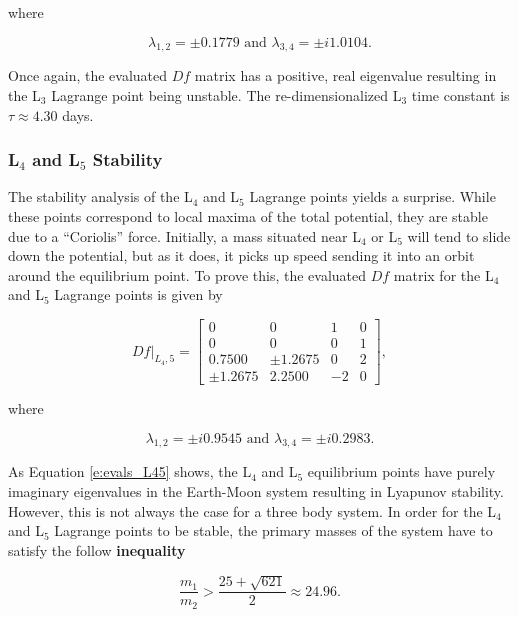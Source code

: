 \documentclass[11pt]{article} %
\begin{document}
\noindent
where

\begin{equation}
	\label{e:evals_L3}
	\lambda_{1,2} = \pm 0.1779 \text{ and } \lambda_{3,4} = \pm i1.0104.
\end{equation}

\noindent
Once again, the evaluated $Df$ matrix has a positive, real eigenvalue resulting in the L$_3$ Lagrange point being unstable. The re-dimensionalized L$_3$ time constant is $\tau\approx4.30$ days.

\subsubsection{L$_4$ and L$_5$ Stability}
The stability analysis of the L$_4$ and L$_5$ Lagrange points yields a surprise. While these points correspond to local maxima of the total potential, they are stable due to a ``Coriolis'' force. Initially, a mass situated near L$_4$ or L$_5$ will tend to slide down the potential, but as it does, it picks up speed sending it into an orbit around the equilibrium point. To prove this, the evaluated $Df$ matrix for the L$_4$ and L$_5$ Lagrange points is given by

\doublespacing
\begin{equation}
	\label{e:df_eval_L45}
	Df|_{L_4,5} = 
	\begin{bmatrix} 
		0 & 0 & 1  & 0 \\ 
		0 & 0 & 0 & 1 \\
		0.7500 & \pm1.2675 & 0 & 2 \\
		\pm1.2675 & 2.2500 & -2 & 0
	\end{bmatrix},
\end{equation}
\singlespacing

\noindent
where

\begin{equation}
	\label{e:evals_L45}
	\lambda_{1,2} = \pm i0.9545 \text{ and } \lambda_{3,4} = \pm i0.2983.
\end{equation}

\noindent
As Equation \ref{e:evals_L45} shows, the L$_4$ and L$_5$ equilibrium points have purely imaginary eigenvalues in the Earth-Moon system resulting in Lyapunov stability. However, this is not always the case for a three body system. In order for the L$_4$ and L$_5$ Lagrange points to be stable, the primary masses of the system have to satisfy the follow \textbf{inequality \cite{ScheersBook}}

\begin{equation}
	\frac{m_1}{m_2} > \frac{25+\sqrt{621}}{2}\approx24.96.
\end{equation}
\end{document}
